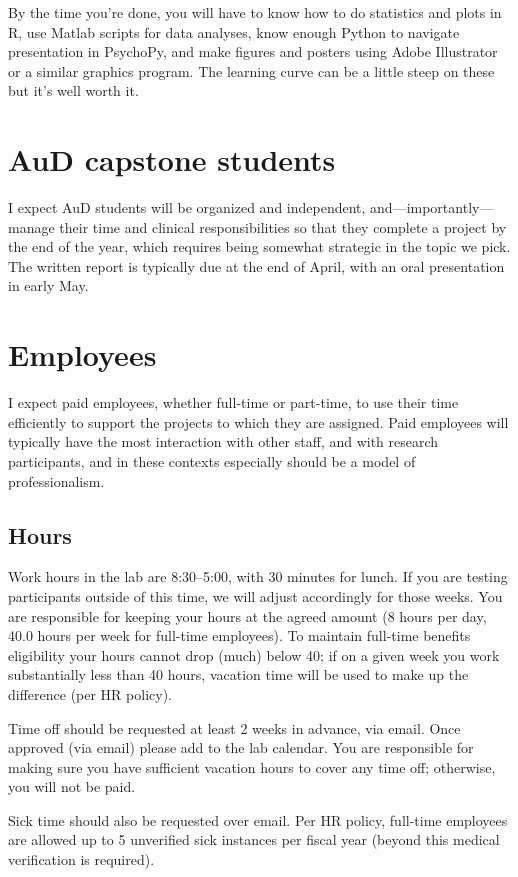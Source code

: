 \documentclass[letterpaper,12pt,oneside]{memoir}
\begin{document}
By the time you're done, you will have to know how to do statistics and plots in R, use Matlab scripts for data analyses, know enough Python to navigate presentation in PsychoPy, and  make figures and posters using Adobe Illustrator or a similar graphics program. The learning curve can be a little steep on these but it's well worth it.

\section{AuD capstone students}
I expect AuD students will be organized and independent, and---importantly---manage their time and clinical responsibilities so that they complete a project by the end of the year, which requires being somewhat strategic in the topic we pick. The written report is typically due at the end of April, with an oral presentation in early May.

\section{Employees}

I expect paid employees, whether full-time or part-time, to use their time efficiently to support the projects to which they are assigned. Paid employees will typically have the most interaction with other staff, and with research participants, and in these contexts especially should be a model of professionalism.

\subsection{Hours}
Work hours in the lab are 8:30--5:00, with 30 minutes for lunch. If you are testing participants outside of this time, we will adjust accordingly for those weeks. You are responsible for keeping your hours at the agreed amount (8 hours per day, 40.0 hours per week for full-time employees). To maintain full-time benefits eligibility your hours cannot drop (much) below 40; if on a given week you work substantially less than 40 hours, vacation time will be used to make up the difference (per HR policy).

Time off should be requested at least 2 weeks in advance, via email. Once approved (via email) please add to the lab calendar. You are responsible for making sure you have sufficient vacation hours to cover any time off; otherwise, you will not be paid.

Sick time should also be requested over email. Per HR policy, full-time employees are allowed up to 5 unverified sick instances per fiscal year (beyond this medical verification is required).
\end{document}
